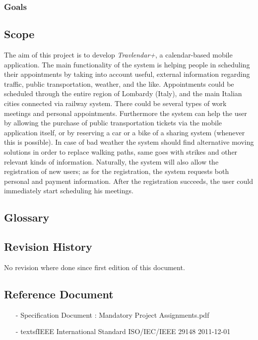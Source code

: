 \documentclass[12pt, a4paper]{article}
\begin{document}
		\subsubsection{Goals}
			
		
		\subsection{Scope}
		The aim of this project is to develop \textit{Travlendar+}, a calendar-based mobile application. 
		The main functionality of the system is helping people in scheduling their appointments by taking into account useful, external information regarding traffic, public transportation, weather, and the like. 
		Appointments could be scheduled through the entire region of Lombardy (Italy), and the main Italian cities connected via railway system. There could be several types of work meetings and personal appointments.
		Furthermore the system can help the user by allowing the purchase of public transportation tickets via the mobile application itself, or by reserving a car or a bike of a sharing system (whenever this is possible). In case of bad weather the system should find alternative moving solutions in order to replace walking paths, same goes with strikes and other relevant kinds of information. 
		Naturally, the system will also allow the registration of new users; as for the registration, the system requests both personal and payment information. After the registration succeeds, the user could immediately start scheduling his meetings.
		
		\subsection{Glossary}
			
		
		\subsection{Revision History}
			No revision where done since first edition of this document.
			
		\subsection{Reference Document}
			\begin{itemize}
				\item[-] \textsf{Specification Document : Mandatory Project Assignments.pdf}
				\item[-] textsf{IEEE International Standard ISO/IEC/IEEE 29148 2011-12-01}
			\end{itemize}
		
\end{document}
